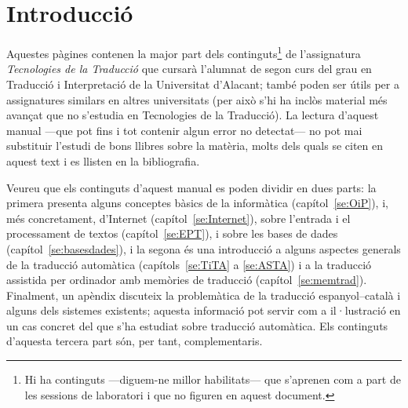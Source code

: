 \chapter{Introducció}

Aquestes pàgines contenen la major part dels continguts\footnote{Hi ha
  continguts ---diguem-ne millor habilitats--- que s'aprenen com a
  part de les sessions de laboratori i que no figuren en aquest
  document.} de l'assignatura \emph{Tecnologies de la Traducció} que
cursarà l'alumnat de segon curs del grau en Traducció i Interpretació
de la Universitat d'Alacant; també poden ser útils per a assignatures
similars en altres universitats (per això s'hi ha inclòs material més
avançat que no s'estudia en Tecnologies de la Traducció).  La lectura
d'aquest manual ---que pot fins i tot contenir algun error no
detectat--- no pot mai substituir l'estudi de bons llibres sobre la
matèria, molts dels quals se citen en aquest text i es llisten en la
bibliografia.
  
Veureu que els continguts d'aquest manual es poden dividir en dues
parts: la primera presenta alguns conceptes bàsics de la informàtica
(capítol~\ref{se:OiP}), i, més concretament, d'Internet
(capítol~\ref{se:Internet}), sobre l'entrada i el processament de
textos (capítol~\ref{se:EPT}), i sobre les bases de dades
(capítol~\ref{se:basesdades}), i la segona és una introducció a alguns
aspectes generals de la traducció automàtica (capítols~\ref{se:TiTA} a
\ref{se:ASTA}) i a la traducció assistida per ordinador amb memòries
de traducció (capítol~\ref{se:memtrad}). Finalment, un apèndix
discuteix la problemàtica de la traducció espanyol--català i alguns
dels sistemes existents; aquesta informació pot servir com a
il·lustració en un cas concret del que s'ha estudiat sobre traducció
automàtica. Els continguts d'aquesta tercera part són, per tant,
complementaris.
  
